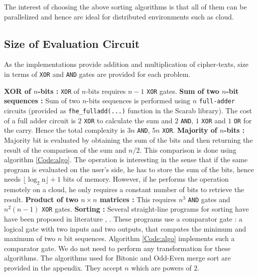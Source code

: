 \documentclass{acm_proc_article-sp}
\begin{document}
The interest of choosing the above sorting algorithms is that all of them can be parallelized and hence are ideal for distributed environments such as cloud. 

\subsection{Size of Evaluation Circuit}
As the implementations provide addition and multiplication of cipher-texts,  size in terms of \texttt{XOR} and \texttt{AND} gates are provided for each problem. 

\textbf{XOR of $n$-bits :} \texttt{XOR} of $n$-bits requires $n-1$ \texttt{XOR} gates. \newline \newline
\textbf{Sum of two $n$-bit sequences :} Sum of two $n$-bits sequences is performed using $n$ \texttt{full-adder} circuits (provided as \texttt{fhe\_fulladd(...)} function in the Scarab library). The cost of a full adder circuit is $2$ \texttt{XOR} to calculate the sum and $2$ \texttt{AND}, $1$ \texttt{XOR} and $1$ \texttt{OR} for the carry. Hence the total complexity is $3n$ \texttt{AND}, $5n$ \texttt{XOR}. \newline \newline
\textbf{Majority of $n$-bits :} Majority bit is evaluated by obtaining the sum of the bits and then returning the result of the comparison of the sum and $n/2$. This comparison is done using algorithm \autoref{Code:algo}. The operation is interesting in the sense that if the same program is evaluated on the user's side, he has to store the sum of the bits, hence  needs $\mathrm{\lfloor\log_{2}n \rfloor +1}$ bits of memory. However, if he performs the operation remotely on a cloud, he only requires a constant number of bits to retrieve the result. \newline \newline
\textbf{Product of two $n\times n$ matrices :} This requires $n^3$ \texttt{AND} gates and \texttt{$n^2(n-1)$} \texttt{XOR} gates. \newline \newline
\textbf{Sorting :} Several straight-line programs for sorting have have been proposed in literature \cite{dk}, \cite{Batcher:1968:SNA:1468075.1468121}. These programs use a comparator gate : a logical gate with two inputs and two outputs, that computes the minimum and maximum of two $n$ bit sequences. Algorithm \autoref{Code:algo} implements such a comparator gate. We do not need to perform any transformation for these algorithms. The algorithms used for Bitonic and Odd-Even merge sort are provided in the appendix. They accept $n$ which are powers of $2$.
\end{document}
